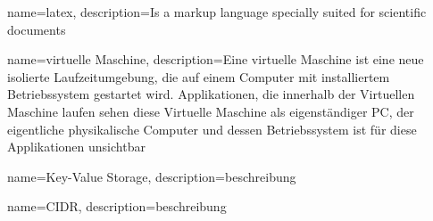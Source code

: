 {
    name=latex,
    description={Is a markup language specially suited 
    for scientific documents}
}

{
    name=virtuelle Maschine,
    description={Eine virtuelle Maschine ist eine neue isolierte Laufzeitumgebung, die auf einem Computer mit installiertem Betriebssystem gestartet wird. Applikationen, die innerhalb der Virtuellen Maschine laufen sehen diese Virtuelle Maschine als eigenständiger PC, der eigentliche physikalische Computer und dessen Betriebssystem ist für diese Applikationen unsichtbar}
}

{
    name=Key-Value Storage,
    description={beschreibung}
}

{
    name=CIDR,
    description={beschreibung}     
}

